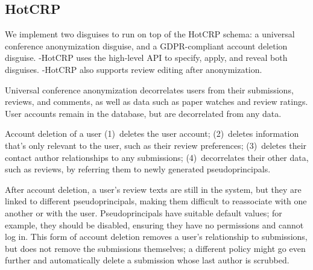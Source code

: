 \subsection{HotCRP}
We implement two disguises to run on top of the HotCRP schema: a universal conference anonymization
disguise, and a GDPR-compliant account deletion disguise.  \sys-HotCRP uses the high-level \sys API
to specify, apply, and reveal both disguises.
\sys-HotCRP also supports review editing after anonymization.  

Universal conference anonymization decorrelates users from their submissions, reviews, and comments,
as well as data such as paper watches and review ratings. User accounts remain in the database, but
are decorrelated from any data.

 Account deletion of a user 
%
(1)~deletes the user account;
%
(2)~deletes information that's only relevant to the user, such as their review preferences;
%
(3)~deletes their contact author relationships to any submissions;
%
(4)~decorrelates their other data, such as reviews, by referring them to newly generated
pseudoprincipals.

After account deletion, a user's review texts are still in the system, but they are linked to
different pseudoprincipals, making them difficult to reassociate with one another or with the user.
%
Pseudoprincipals have suitable default values; for example, they should be disabled, ensuring they
have no permissions and cannot log in.
%
This form of account deletion removes a user's relationship to submissions, but does not remove the
submissions themselves; a different policy might go even further and automatically delete a
submission whose last author is scrubbed.

